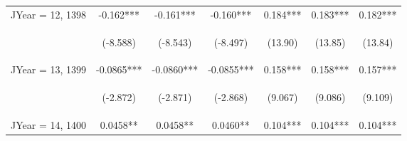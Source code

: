 \documentclass[]{standalone}
\begin{document}
\begin{tabular}{lcccccc}
    JYear = 12, 1398 & -0.162***                                      & -0.161***                                      & -0.160***                                      & 0.184***                                       & 0.183***                                       & 0.182***                                       \\
    \vspace{4pt}     & \begin{footnotesize}(-8.588)\end{footnotesize} & \begin{footnotesize}(-8.543)\end{footnotesize} & \begin{footnotesize}(-8.497)\end{footnotesize} & \begin{footnotesize}(13.90)\end{footnotesize}  & \begin{footnotesize}(13.85)\end{footnotesize}  & \begin{footnotesize}(13.84)\end{footnotesize}  \\
    JYear = 13, 1399 & -0.0865***                                     & -0.0860***                                     & -0.0855***                                     & 0.158***                                       & 0.158***                                       & 0.157***                                       \\
    \vspace{4pt}     & \begin{footnotesize}(-2.872)\end{footnotesize} & \begin{footnotesize}(-2.871)\end{footnotesize} & \begin{footnotesize}(-2.868)\end{footnotesize} & \begin{footnotesize}(9.067)\end{footnotesize}  & \begin{footnotesize}(9.086)\end{footnotesize}  & \begin{footnotesize}(9.109)\end{footnotesize}  \\
    JYear = 14, 1400 & 0.0458**                                       & 0.0458**                                       & 0.0460**                                       & 0.104***                                       & 0.104***                                       & 0.104***                                       \\

\end{tabular}
\end{document}
